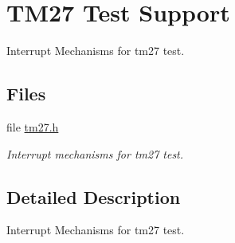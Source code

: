 \hypertarget{group__zynqmp__tm27}{}\section{T\+M27 Test Support}
\label{group__zynqmp__tm27}


Interrupt Mechanisms for tm27 test.  


\subsection*{Files}
\begin{DoxyCompactItemize}
\item 
file \mbox{\hyperlink{arm_2xilinx-zynqmp_2include_2tm27_8h}{tm27.\+h}}
\begin{DoxyCompactList}\small\item\em Interrupt mechanisms for tm27 test. \end{DoxyCompactList}\end{DoxyCompactItemize}


\subsection{Detailed Description}
Interrupt Mechanisms for tm27 test. 

